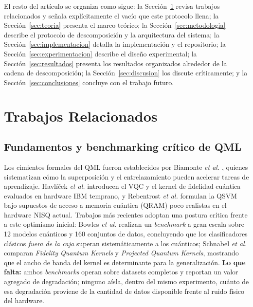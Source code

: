\documentclass[conference]{IEEEtran}
\begin{document}
El resto del artículo se organiza como sigue: la Sección~\ref{sec:related} revisa trabajos relacionados y señala explícitamente el vacío que este protocolo llena; la Sección~\ref{sec:teoria} presenta el marco teórico; la Sección~\ref{sec:metodologia} describe el protocolo de descomposición y la arquitectura del sistema; la Sección~\ref{sec:implementacion} detalla la implementación y el repositorio; la Sección~\ref{sec:experimentacion} describe el diseño experimental; la Sección~\ref{sec:resultados} presenta los resultados organizados alrededor de la cadena de descomposición; la Sección~\ref{sec:discusion} los discute críticamente; y la Sección~\ref{sec:conclusiones} concluye con el trabajo futuro.

\section{Trabajos Relacionados}
\label{sec:related}

\subsection{Fundamentos y benchmarking crítico de QML}
Los cimientos formales del QML fueron establecidos por Biamonte \textit{et al.} \cite{biamonte2017}, quienes sistematizan cómo la superposición y el entrelazamiento pueden acelerar tareas de aprendizaje. Havlíček \textit{et al.} \cite{havlicek2019} introducen el VQC y el kernel de fidelidad cuántica evaluados en hardware IBM temprano, y Rebentrost \textit{et al.} \cite{rebentrost2014} formulan la QSVM bajo supuestos de acceso a memoria cuántica (QRAM) poco realistas en el hardware NISQ actual. Trabajos más recientes adoptan una postura crítica frente a este optimismo inicial: Bowles \textit{et al.} \cite{bowles2024} realizan un \textit{benchmark} a gran escala sobre 12 modelos cuánticos y 160 conjuntos de datos, concluyendo que los clasificadores clásicos \textit{fuera de la caja} superan sistemáticamente a los cuánticos; Schnabel \textit{et al.} \cite{schnabel2024} comparan \textit{Fidelity Quantum Kernels} y \textit{Projected Quantum Kernels}, mostrando que el ancho de banda del kernel es determinante para la generalización. \textbf{Lo que falta:} ambos \textit{benchmarks} operan sobre datasets completos y reportan un valor agregado de degradación; ninguno aísla, dentro del mismo experimento, cuánto de esa degradación proviene de la cantidad de datos disponible frente al ruido físico del hardware.
\end{document}
